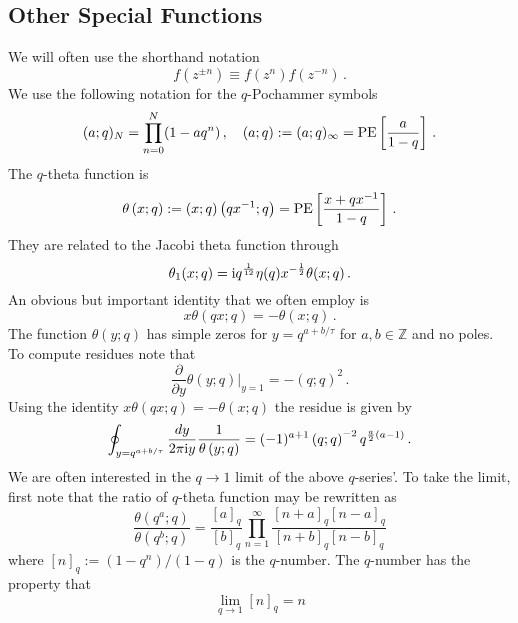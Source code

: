 \documentclass[main.tex]{subfiles}
\begin{document}
\subsection{Other Special Functions}
We will often use the shorthand notation
\begin{equation}
f(z^{\pm n})\equiv f(z^n)f(z^{-n})\,.
\end{equation}
We use the following notation for the $q$-Pochammer symbols
\begin{equation}\label{eqn:qPochammer}
(a;q)_N=\prod_{n=0}^{N}(1-aq^n)\,,\quad (a;q):=(a;q)_{\infty}=\operatorname{\mathrm{PE}}\left[\frac{a}{1-q}\right]\,.
\end{equation}
The $q$-theta function is
\begin{equation}\label{eqn:qtheta}
\theta\left(x;q\right):=\left(x;q\right)\left(qx^{-1};q\right)=\operatorname{\mathrm{PE}}\left[\frac{x+qx^{-1}}{1-q}\right]\,.
\end{equation}
They are related to the Jacobi theta function through
\begin{equation}
\theta_1(x;q)=\mathrm{i} q^{\frac{1}{12}}\eta(q)x^{-\frac{1}{2}}\theta(x;q)\,.
\end{equation}
An obvious but important identity that we often employ is
\begin{equation}
x\theta\left(qx;q\right)=-\theta\left(x;q\right)\,.
\end{equation}
The function $\theta\left(y;q\right)$ has simple zeros for $y=q^{a+b/\tau}$ for $a,b\in\mathbb{Z}$ and no poles. To compute residues note that
\begin{equation}
\frac{\partial}{\partial y}\theta\left(y;q\right)|_{y=1}=-\left(q;q\right)^2\,.
\end{equation}
Using the identity $x\theta\left(qx;q\right)=-\theta\left(x;q\right)$ the residue is given by
\begin{equation}\label{eqn:residueform}
\oint_{y=q^{a+b/\tau}}\frac{dy}{2\pi\mathrm{i} y}\frac{1}{\theta\left(y;q\right)}=(-1)^{a+1}\left(q;q\right)^{-2}q^{\frac{a}{2}\left(a-1\right)}\,.
\end{equation}
We are often interested in the $q\to1$ limit of the above $q$-series'. To take the limit, first note that the ratio of $q$-theta function may be rewritten as
\begin{equation}
\frac{\theta\left(q^a;q\right)}{\theta\left(q^b;q\right)}=\frac{\left[a\right]_q}{\left[b\right]_q}\prod_{n=1}^{\infty}\frac{\left[n+a\right]_q\left[n-a\right]_q}{\left[n+b\right]_q\left[n-b\right]_q}
\end{equation}
where $[n]_q:=(1-q^n)/(1-q)$ is the $q$-number. The $q$-number has the property that \begin{equation}
\lim_{q\to1}[n]_q=n
\end{equation}
\end{document}
